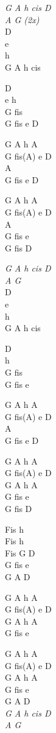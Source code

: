 \begin{chord}
    \textit{G A h cis D}\\
    \textit{A G (2x)}\\
    D\\
    e\\
    h\\
    G A h cis

    D\\
    e h\\
    G fis\\
    G fis e D

    G A h A\\
    G fis(A) e D\\
    A\\
    G fis e D

    G A h A\\
    G fis(A) e D\\
    A\\
    G fis e\\
    G fis D

    \textit{G A h cis D}\\
    \textit{A G}\\
    D\\
    e\\
    h\\
    G A h cis

    D\\
    h\\
    G fis\\
    G fis e

    G A h A\\
    G fis(A) e D\\
    A\\
    G fis e D

    G A h A\\
    G fis(A) e D\\
    G A h A\\
    G fis e\\
    G fis D

    Fis h\\
    Fis h\\
    Fis G D\\
    G fis e\\
    G A D

    G A h A\\
    G fis(A) e D\\
    G A h A\\
    G fis e

    G A h A\\
    G fis(A) e D\\
    G A h A\\
    G fis e\\
    G A D\\
    \textit{G A h cis D}\\
    \textit{A G}
\end{chord}
